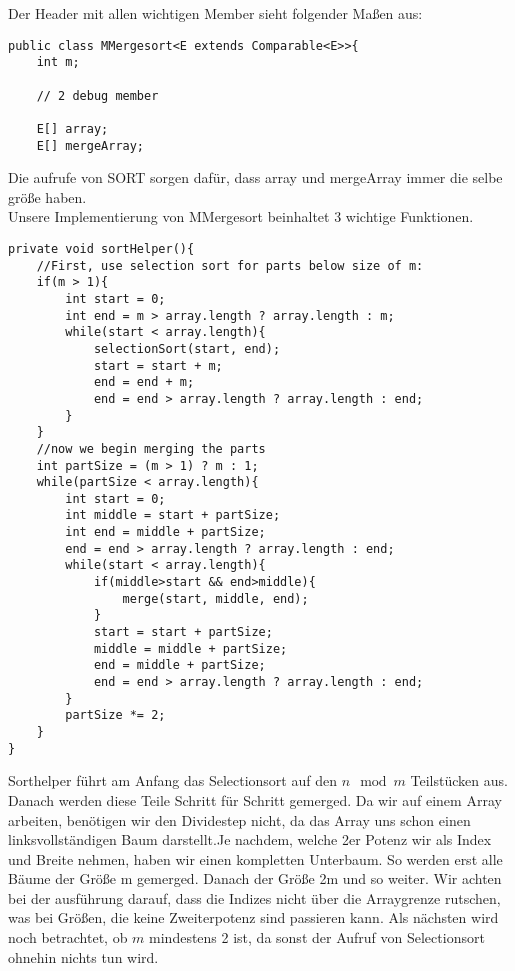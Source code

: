 \documentclass[11pt,a4paper,ngerman]{article}
\begin{document}
Der Header mit allen wichtigen Member sieht folgender Maßen aus:
\begin{lstlisting}
public class MMergesort<E extends Comparable<E>>{
	int m;

	// 2 debug member	

	E[] array;
	E[] mergeArray;
\end{lstlisting}

Die aufrufe von SORT sorgen dafür, dass array und mergeArray immer die selbe größe haben.\\
Unsere Implementierung von MMergesort beinhaltet 3 wichtige Funktionen.\\
\begin{lstlisting}
private void sortHelper(){
	//First, use selection sort for parts below size of m:
	if(m > 1){
		int start = 0;
		int end = m > array.length ? array.length : m;
		while(start < array.length){
			selectionSort(start, end);
			start = start + m;
			end = end + m;
			end = end > array.length ? array.length : end;
		}
	}
	//now we begin merging the parts
	int partSize = (m > 1) ? m : 1;
	while(partSize < array.length){
		int start = 0;
		int middle = start + partSize;
		int end = middle + partSize;
		end = end > array.length ? array.length : end;
		while(start < array.length){
			if(middle>start && end>middle){
				merge(start, middle, end);
			}
			start = start + partSize;
			middle = middle + partSize;
			end = middle + partSize;
			end = end > array.length ? array.length : end;
		}
		partSize *= 2;
	}
}
\end{lstlisting}

Sorthelper führt am Anfang das Selectionsort auf den $n \mod m$ Teilstücken aus. Danach werden diese Teile Schritt für Schritt gemerged. Da wir auf einem Array arbeiten, benötigen wir den Dividestep nicht, da das Array uns schon einen linksvollständigen Baum darstellt.Je nachdem, welche 2er Potenz wir als Index und Breite nehmen, haben wir einen kompletten Unterbaum. So werden erst alle Bäume der Größe m gemerged. Danach der Größe 2m und so weiter. Wir achten bei der ausführung darauf, dass die Indizes nicht über die Arraygrenze rutschen, was bei Größen, die keine Zweiterpotenz sind passieren kann. Als nächsten wird noch betrachtet, ob $m$ mindestens 2 ist, da sonst der Aufruf von Selectionsort ohnehin nichts tun wird.\\
\vspace{\baselineskip}\\
\end{document}
